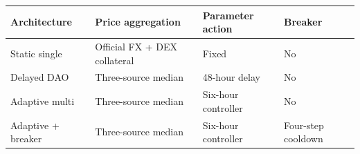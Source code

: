\begin{tabular}{p{3.2cm}p{4.0cm}p{3.2cm}p{2.6cm}}
\toprule
Architecture & Price aggregation & Parameter action & Breaker \\
\midrule
Static single & Official FX + DEX collateral & Fixed & No \\
Delayed DAO & Three-source median & 48-hour delay & No \\
Adaptive multi & Three-source median & Six-hour controller & No \\
Adaptive + breaker & Three-source median & Six-hour controller & Four-step cooldown \\
\bottomrule
\end{tabular}
